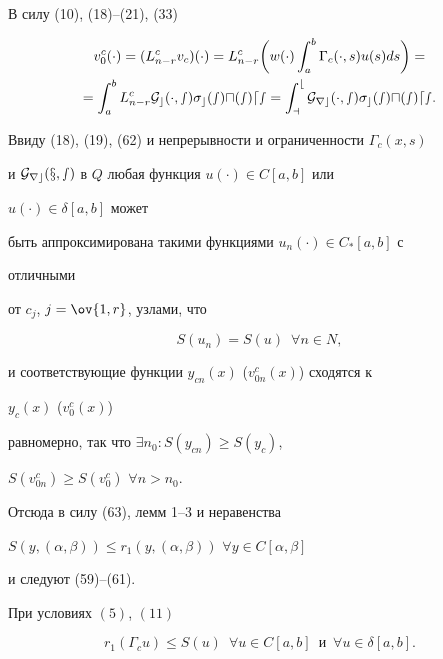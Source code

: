 \begin{pf} В силу (10), (18)--(21), (33) 


\begin{multline} 


v^c_0(\cdot)=(L^c_{n-r}v_c)(\cdot)=L^c_{n-r}\bigg( 


w(\cdot)\int^b_a\Gamma_c(\cdot,s)u(s)ds\bigg)= \\ 


=\int^b_a L^c_{n-r}\cal G_c(\cdot,s) 


\sigma_c(s)u(s)ds=\int^b_a \cal G_{r c}(\cdot,s) 


\sigma_c(s)u(s)ds. 


\end{multline} 


Ввиду (18), (19), (62) и непрерывности и ограниченности $\Gamma_c(x,s)$ 


и $\cal G_{r c}(x,s)$ в $Q$ любая функция $u(\cdot)\in C[a,b]$ или 


$u(\cdot)\in\delta[a,b]$ может 


быть аппроксимирована такими функциями $u_n(\cdot)\in C_*[a,b]$ с 


отличными 


от $c_j$, $j=\ov{1,r}$, узлами, что 


\begin{equation} 


S(u_n)=S(u)\ \; \forall n\in N,


\end{equation} 


и соответствующие функции $y_{c n}(x)$ ($v^c_{0n}(x)$) сходятся к 


$y_c(x)$ ($v^c_0(x)$) 


равномерно, так что $\exists n_0:S(y_{c n})\ge S(y_c)$, 


$S(v^c_{0n})\ge{}S(v^c_0)$ $\forall n>n_0$. 


Отсюда в силу (63), лемм 1--3 и неравенства 


$S(y,(\alpha,\beta))\le r_1(y,(\alpha,\beta))$ $\forall y\in 


C[\alpha,\beta]$ 


и следуют (59)--(61). 


\end{pf} 


 


\begin{lem} При условиях $(5)$, $(11)$ 


$$ 


r_1(\Gamma_c u)\le S(u)\ \; \forall u\in C[a,b]\ \; 


\text{и} 


\ \; \forall u\in\delta[a,b]. 


$$ 


\end{lem} 


